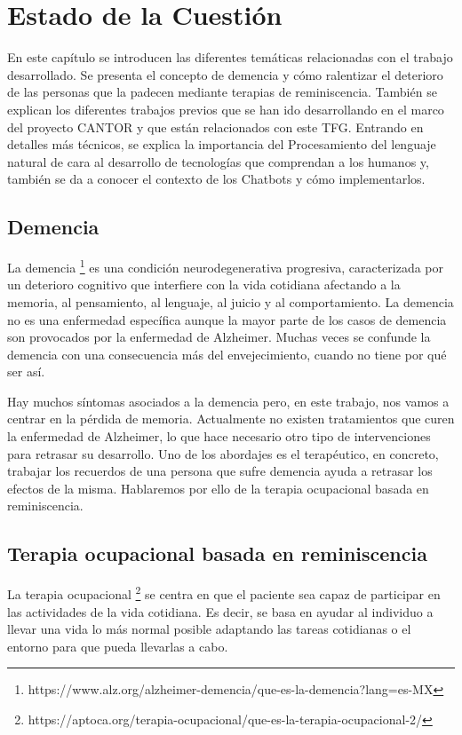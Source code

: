 \chapter{Estado de la Cuestión}
\label{cap:estadoDeLaCuestion}

En este capítulo se introducen las diferentes temáticas relacionadas con el trabajo desarrollado. Se presenta el concepto de demencia y cómo ralentizar el deterioro de las personas que la padecen mediante terapias de reminiscencia. También se explican los diferentes trabajos previos que se han ido desarrollando en el marco del proyecto CANTOR y que están relacionados con este TFG. Entrando en detalles más técnicos, se explica la importancia del Procesamiento del lenguaje natural de cara al desarrollo de tecnologías que comprendan a los humanos y, también se da a conocer el contexto de los Chatbots y cómo implementarlos.


\section{Demencia}
La demencia \footnote{https://www.alz.org/alzheimer-demencia/que-es-la-demencia?lang=es-MX} es una condición neurodegenerativa progresiva, caracterizada por un deterioro cognitivo que interfiere con la vida cotidiana afectando a la memoria, al pensamiento, al lenguaje, al juicio y al comportamiento. La demencia no es una enfermedad específica aunque la mayor parte de los casos de demencia son provocados por la enfermedad de Alzheimer. Muchas veces se confunde la demencia con una consecuencia más del envejecimiento, cuando no tiene por qué ser así.

Hay muchos síntomas asociados a la demencia pero, en este trabajo, nos vamos a centrar en la pérdida de memoria. Actualmente no existen tratamientos que curen la enfermedad de Alzheimer, lo que hace necesario otro tipo de intervenciones para retrasar su desarrollo. Uno de los abordajes es el terapéutico, en concreto, trabajar los recuerdos de una persona que sufre demencia ayuda a retrasar los efectos de la misma. Hablaremos por ello de la terapia ocupacional basada en reminiscencia.

\section{Terapia ocupacional basada en reminiscencia}
La terapia ocupacional \footnote{https://aptoca.org/terapia-ocupacional/que-es-la-terapia-ocupacional-2/} se centra en que el paciente sea capaz de participar en las actividades de la vida cotidiana. Es decir, se basa en ayudar al individuo a llevar una vida lo más normal posible adaptando las tareas cotidianas o el entorno para que pueda llevarlas a cabo.

